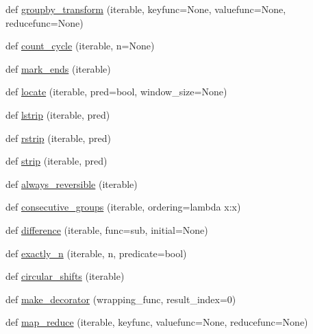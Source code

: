 \begin{DoxyCompactItemize}
def \hyperlink{namespacesetuptools_1_1__vendor_1_1more__itertools_1_1more_a9f3de1e0322f346b3b2c7f6cf6858603}{groupby\+\_\+transform} (iterable, keyfunc=None, valuefunc=None, reducefunc=None)
\item 
def \hyperlink{namespacesetuptools_1_1__vendor_1_1more__itertools_1_1more_a7bc0fb25048f2e5d9c13afa0b425a3a6}{count\+\_\+cycle} (iterable, n=None)
\item 
def \hyperlink{namespacesetuptools_1_1__vendor_1_1more__itertools_1_1more_ac5acb740dfb97a2580b1c9c55d287503}{mark\+\_\+ends} (iterable)
\item 
def \hyperlink{namespacesetuptools_1_1__vendor_1_1more__itertools_1_1more_a35444700693b3657e4b259463067ce02}{locate} (iterable, pred=bool, window\+\_\+size=None)
\item 
def \hyperlink{namespacesetuptools_1_1__vendor_1_1more__itertools_1_1more_a20f3fff7a2235b5cbabd885f755aac46}{lstrip} (iterable, pred)
\item 
def \hyperlink{namespacesetuptools_1_1__vendor_1_1more__itertools_1_1more_a075d2f23dd00cf2043eac197cc11039a}{rstrip} (iterable, pred)
\item 
def \hyperlink{namespacesetuptools_1_1__vendor_1_1more__itertools_1_1more_a438cea9758b7e375446ebefb5991b578}{strip} (iterable, pred)
\item 
def \hyperlink{namespacesetuptools_1_1__vendor_1_1more__itertools_1_1more_aea4fa17fcd6b2a3bac60640b73da5434}{always\+\_\+reversible} (iterable)
\item 
def \hyperlink{namespacesetuptools_1_1__vendor_1_1more__itertools_1_1more_abd9ab8bac8a71702ca7bda7826edf112}{consecutive\+\_\+groups} (iterable, ordering=lambda x\+:x)
\item 
def \hyperlink{namespacesetuptools_1_1__vendor_1_1more__itertools_1_1more_a29e419785b6735ee5495c21142feaf8e}{difference} (iterable, func=sub, initial=None)
\item 
def \hyperlink{namespacesetuptools_1_1__vendor_1_1more__itertools_1_1more_a70e0e6affdf32d1da9ed7f03bd821338}{exactly\+\_\+n} (iterable, n, predicate=bool)
\item 
def \hyperlink{namespacesetuptools_1_1__vendor_1_1more__itertools_1_1more_a649ba5fe06cf09fd37714753885ba36a}{circular\+\_\+shifts} (iterable)
\item 
def \hyperlink{namespacesetuptools_1_1__vendor_1_1more__itertools_1_1more_a58531b8a5db48cae80f6ef2af30de908}{make\+\_\+decorator} (wrapping\+\_\+func, result\+\_\+index=0)
\item 
def \hyperlink{namespacesetuptools_1_1__vendor_1_1more__itertools_1_1more_aeb75e076a0e72311a8a333fa52b1c4c8}{map\+\_\+reduce} (iterable, keyfunc, valuefunc=None, reducefunc=None)

\end{DoxyCompactItemize}
